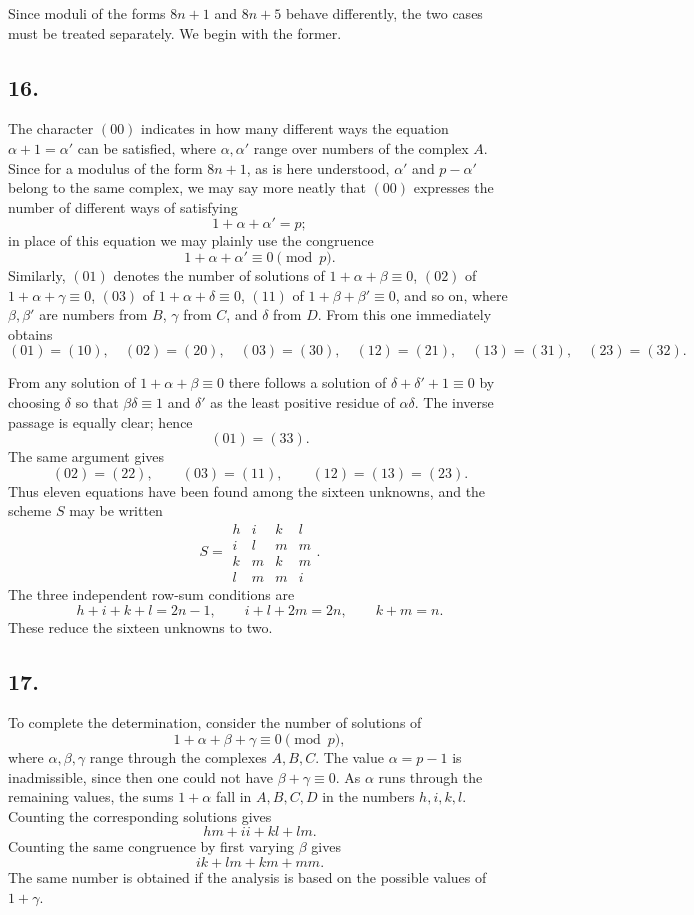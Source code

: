 \documentclass[12pt]{article}
\begin{document}
Since moduli of the forms $8n+1$ and $8n+5$ behave differently, the two cases must be treated separately. We begin with the former.

\subsection*{16.}

The character $(00)$ indicates in how many different ways the equation $\alpha+1=\alpha'$ can be satisfied, where $\alpha,\alpha'$ range over numbers of the complex $A$. Since for a modulus of the form $8n+1$, as is here understood, $\alpha'$ and $p-\alpha'$ belong to the same complex, we may say more neatly that $(00)$ expresses the number of different ways of satisfying
\[
1+\alpha+\alpha'=p;
\]
in place of this equation we may plainly use the congruence
\[
1+\alpha+\alpha'\equiv0\pmod p.
\]
Similarly, $(01)$ denotes the number of solutions of $1+\alpha+\beta\equiv0$, $(02)$ of $1+\alpha+\gamma\equiv0$, $(03)$ of $1+\alpha+\delta\equiv0$, $(11)$ of $1+\beta+\beta'\equiv0$, and so on, where $\beta,\beta'$ are numbers from $B$, $\gamma$ from $C$, and $\delta$ from $D$. From this one immediately obtains
\[
(01)=(10),\quad (02)=(20),\quad (03)=(30),\quad
(12)=(21),\quad (13)=(31),\quad (23)=(32).
\]

From any solution of $1+\alpha+\beta\equiv0$ there follows a solution of $\delta+\delta'+1\equiv0$ by choosing $\delta$ so that $\beta\delta\equiv1$ and $\delta'$ as the least positive residue of $\alpha\delta$. The inverse passage is equally clear; hence
\[
(01)=(33).
\]
The same argument gives
\[
(02)=(22),\qquad (03)=(11),\qquad (12)=(13)=(23).
\]
Thus eleven equations have been found among the sixteen unknowns, and the scheme $S$ may be written
\[
S=\begin{array}{rrrr}
h&i&k&l\\
i&l&m&m\\
k&m&k&m\\
l&m&m&i
\end{array}.
\]
The three independent row-sum conditions are
\[
h+i+k+l=2n-1,\qquad i+l+2m=2n,\qquad k+m=n.
\]
These reduce the sixteen unknowns to two.

\subsection*{17.}

To complete the determination, consider the number of solutions of
\[
1+\alpha+\beta+\gamma\equiv0\pmod p,
\]
where $\alpha,\beta,\gamma$ range through the complexes $A,B,C$. The value $\alpha=p-1$ is inadmissible, since then one could not have $\beta+\gamma\equiv0$. As $\alpha$ runs through the remaining values, the sums $1+\alpha$ fall in $A,B,C,D$ in the numbers $h,i,k,l$. Counting the corresponding solutions gives
\[
hm+ii+kl+lm.
\]
Counting the same congruence by first varying $\beta$ gives
\[
ik+lm+km+mm.
\]
The same number is obtained if the analysis is based on the possible values of $1+\gamma$.
\end{document}
